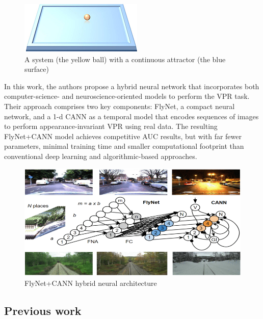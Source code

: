 \begin{figure}[h!]
\centering
\includegraphics[width=0.5\linewidth]{images/continuousattractor.jpg}
\caption{A system (the yellow ball) with a continuous attractor (the blue surface)}
\end{figure}

In this work, the authors propose a hybrid neural network that
incorporates both computer-science- and neuroscience-oriented models to
perform the VPR task. Their approach comprises two key components:
FlyNet, a compact neural network, and a 1-d CANN as a temporal model
that encodes sequences of images to perform appearance-invariant VPR
using real data. The resulting FlyNet+CANN model achieves competitive
AUC results, but with far fewer parameters, minimal training time and
smaller computational footprint than conventional deep learning and
algorithmic-based approaches.

\begin{figure}[h!]
\centering
\includegraphics[width=0.8\linewidth]{images/flynetcann.png}
\caption{FlyNet+CANN hybrid neural architecture}
\end{figure}

\subsection{Previous work}\label{header-n187}

